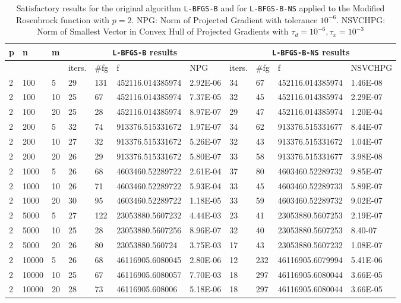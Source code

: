 \begin{center}
  \begin{table}
    \begin{center}
      \scriptsize
      \begin{tabular}{|l|l|l|l|l|l|l|l|l|l|l|}
        \hline
      p &  n  &  m  & \multicolumn{4}{|c|}{\texttt{L-BFGS-B} results} & \multicolumn{4}{|c|}{\texttt{L-BFGS-B-NS} results} \\ \hline
        & &  & iters. & \#fg & f & NPG & iters. & \#fg & f & NSVCHPG \\ \hline
      2 &  100 & 5 & 29 & 131 & 452116.014385974 & 2.92E-06 & 34 & 67 & 452116.014385974 & 1.46E-08\\
      2 &  100 & 10  & 25 & 67 & 452116.014385974 & 7.37E-05 & 32 & 45 & 452116.014385974 & 2.29E-07\\
      2 &  100 & 20  & 25 & 28 & 452116.014385974 & 8.97E-07 & 29 & 47 & 452116.014385974 & 1.20E-04\\
      2 &  200 & 5 & 32 & 74 & 913376.515331672 & 1.97E-07 & 34 & 62 & 913376.515331677 & 8.44E-07\\
      2 &  200 & 10  & 27 & 32 & 913376.515331672 & 5.26E-07 & 32 & 43 & 913376.515331672 & 1.04E-07\\
      2 &  200 & 20  & 26 & 29 & 913376.515331672 & 5.80E-07 & 33 & 58 & 913376.515331677 & 3.98E-08\\
      2 &  1000 & 5  & 26 & 68 & 4603460.52289722 & 2.61E-04 & 37 & 80 & 4603460.52289732 & 9.85E-07\\
      2 &  1000 & 10  & 26 & 71 & 4603460.52289722 & 5.93E-04 & 33 & 45 & 4603460.52289733 & 5.89E-07\\
      2 &  1000 & 20  & 30 & 95 & 4603460.52289722 & 1.18E-05 & 33 & 59 & 4603460.52289732 & 9.02E-07\\
      2 & 5000 & 5 & 27 & 122 & 23053880.5607232 & 4.44E-03 & 23 & 41 & 23053880.5607253 & 2.19E-07\\
      2 & 5000 & 10 & 25 & 28 & 23053880.5607256 & 8.96E-07 & 32 & 40 & 23053880.5607253 & 8.40-07\\
      2 & 5000 & 20 & 26 & 80 & 23053880.560724 & 3.75E-03 & 17 & 43 & 23053880.5607232 & 1.08E-07\\
      2 & 10000 & 5 & 26 & 68 & 46116905.6080045 & 2.80E-06 & 12 & 232 & 46116905.6079994 & 5.41E-06\\
      2 & 10000 & 10 & 25 & 67 & 46116905.6080057 & 7.70E-03 & 18 & 297 & 46116905.6080044 & 3.66E-05\\
      2 & 10000 & 20 & 28 & 73 & 46116905.608006 & 5.18E-06 & 18 & 297 & 46116905.6080044 & 3.66E-05\\
      \hline
      \end{tabular}
      \caption[Modified Rosenbrock with $p = 2$]{Satisfactory results for the original algorithm \texttt{L-BFGS-B}  and for \texttt{L-BFGS-B-NS} applied to the Modified Rosenbrock function with $p = 2$. NPG: Norm of Projected Gradient with tolerance $10^{-6}$. 
NSVCHPG: Norm of Smallest Vector in Convex Hull of Projected Gradients with $\tau_d = 10^{-6}, \tau_x = 10^{-3}$}
      \label{pequal2}
    \end{center}
  \end{table}
\end{center}

